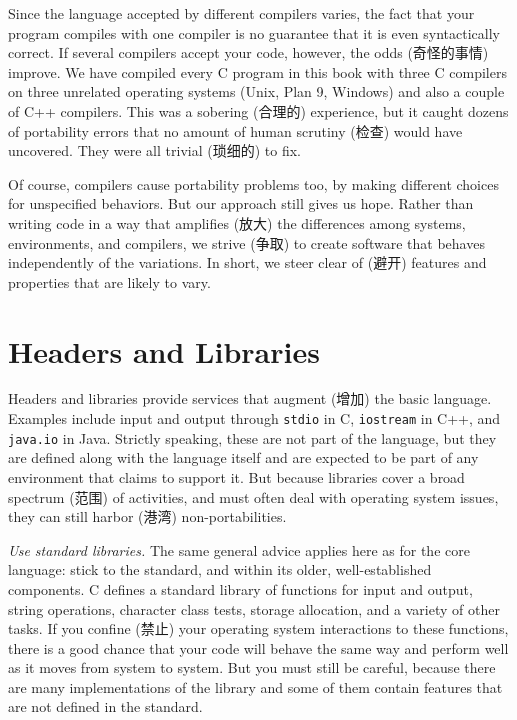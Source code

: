 Since the language accepted by different compilers varies, the fact that
your program compiles with one compiler is no guarantee that it is even
syntactically correct.  If several compilers accept your code, however, the
odds (奇怪的事情) improve. We have compiled every C program in this book
with three C compilers on three unrelated operating systems (Unix, Plan 9,
Windows) and also a couple of C++ compilers. This was a sobering (合理的)
experience, but it caught dozens of portability errors that no amount of
human scrutiny (检查) would have uncovered. They were all trivial (琐细的)
to fix.

Of course, compilers cause portability problems too, by making different
choices for unspecified behaviors. But our approach still gives us hope.
Rather than writing code in a way that amplifies (放大) the differences
among systems, environments, and compilers, we strive (争取) to create
software that behaves independently of the variations. In short, we steer
clear of (避开) features and properties that are likely to vary.

\section{Headers and Libraries}
\label{sec:header_library}

Headers and libraries provide services that augment (增加) the basic
language.  Examples include input and output through \verb'stdio' in C,
\verb'iostream' in C++, and \verb'java.io' in Java.  Strictly speaking,
these are not part of the language, but they are defined along with the
language itself and are expected to be part of any environment that claims
to support it. But because libraries cover a broad spectrum (范围) of
activities, and must often deal with operating system issues, they can
still harbor (港湾) non-portabilities.

\emph{Use standard libraries.} The same general advice applies here as for
the core language: stick to the standard, and within its older,
well-established components. C defines a standard library of functions for
input and output, string operations, character class tests, storage
allocation, and a variety of other tasks. If you confine (禁止) your
operating system interactions to these functions, there is a good chance
that your code will behave the same way and perform well as it moves from
system to system. But you must still be careful, because there are many
implementations of the library and some of them contain features that are
not defined in the standard.

